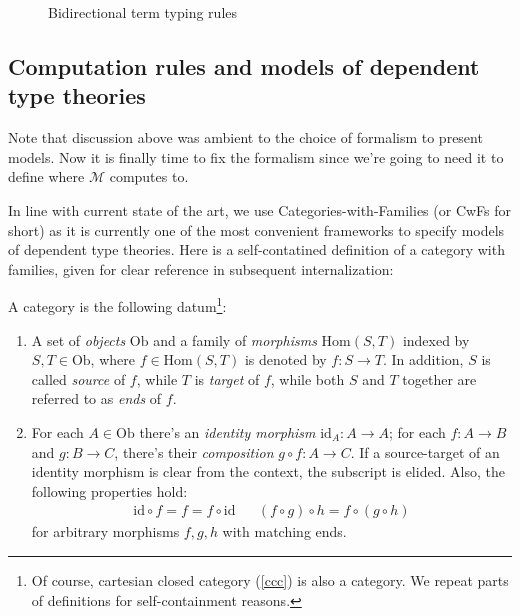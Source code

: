 \begin{figure}
\caption{Bidirectional term typing rules}
\Description{}
\label{mltt-r-typing}
\end{figure}

\subsection{Computation rules and models of dependent
type theories}

Note that discussion above was ambient to the choice of
formalism to present models. Now it is finally time to
fix the formalism since we're going to need it to
define where $\mathcal{M}$ computes to.

In line with current state of the art, we use
Categories-with-Families \cite{castellan2020cwf} (or
CwFs for short) as it is currently one of the most
convenient frameworks to specify models of dependent
type theories. Here is a self-contatined definition of
a category with families, given for clear reference in
subsequent internalization:

\begin{definition}[Category]
A category is the following datum\footnote{Of course,
cartesian closed category (\ref{ccc}) is also a
category. We repeat parts of definitions for
self-containment reasons.}:
\begin{enumerate}
\item A set of \textit{objects} $\mathrm{Ob}$ and a
    family of \textit{morphisms} $\mathrm{Hom}(S, T)$
    indexed by $S,T\in\mathrm{Ob}$, where
    $f\in\mathrm{Hom}(S,T)$ is denoted by $f:S\to T$. In
    addition, $S$ is called \textit{source} of $f$,
    while $T$ is \textit{target} of $f$, while both $S$
    and $T$ together are referred to as \textit{ends} of
    $f$.
\item For each $A\in\mathrm{Ob}$ there's an
    \textit{identity morphism} $\mathrm{id}_A: A\to A$;
    for each $f:A\to B$ and $g:B\to C$, there's their
    \textit{composition} $g\circ f:A\to C$. If a
    source-target of an identity morphism is clear from
    the context, the subscript is elided. Also, the
    following properties hold:
    \begin{align*}
        \mathrm{id}\circ f = f = f\circ\mathrm{id} & &
        (f \circ g) \circ h = f \circ (g \circ h)
    \end{align*}
    for arbitrary morphisms $f,g,h$ with matching ends.
\end{enumerate}
\end{definition}

